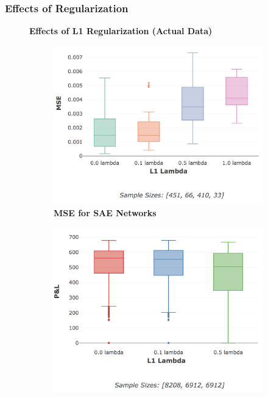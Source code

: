 \documentclass[a4paper,11pt,oneside]{article}
\theoremstyle{plain}
\theoremstyle{definition}
\begin{document}
\subsubsection{Effects of Regularization}


\begin{figure}[H]
	\centering
	\textbf{Effects of L1 Regularization (Actual Data)}
	\begin{subfigure}{.5\textwidth}
		\centering 
		\includegraphics[scale=0.3]{images/results/network/reg/actual_mse_reg.png}
		\caption{\textbf{MSE for SAE Networks} 
			\newline }
		\label{figure-actual_mse_reg}
	\end{subfigure}%
	\begin{subfigure}{.5\textwidth}
		\centering 
		\includegraphics[scale=0.3]{images/results/network/reg/actual_pl_reg.png}

\end{subfigure}
\end{figure}
\end{document}
